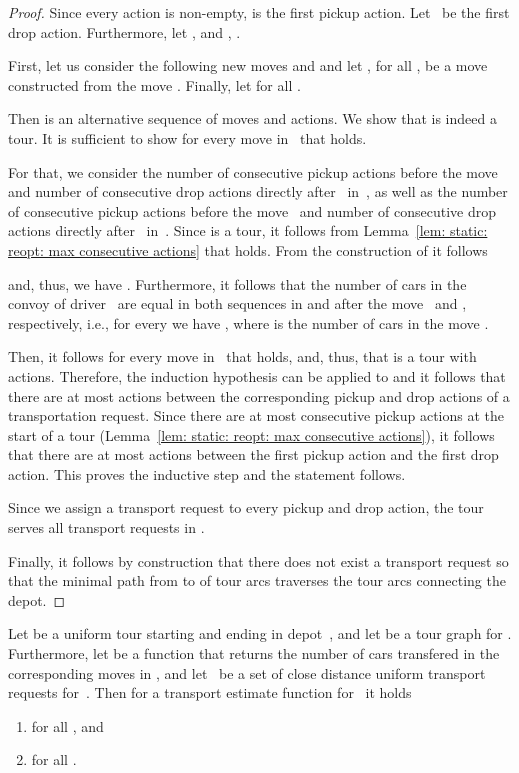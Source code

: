 \documentclass[english]{llncs}
\numberwithin{sublemma}{lemma}
\begin{document}
\begin{proof}
Since every action is non-empty,  is the first pickup action.
Let~ be the first drop action.
Furthermore, let , 
and , .

First, let us consider the following new moves  and 
 and
let , for all , be a move constructed from the move .
Finally, let  for all .

Then 
is an alternative sequence of  moves and  actions.
We show that  is indeed a tour.
It is sufficient to show for every move  in~ that  holds.

For that, we consider the number  of consecutive pickup actions before the move~ and 
number  of consecutive drop actions directly after~ in~,
as well as
the number  of consecutive pickup actions before the move~ and 
number  of consecutive drop actions directly after~ in~.
Since  is a tour, it follows from Lemma~\ref{lem: static: reopt: max consecutive actions} that  holds.
From the construction of  it follows

and, thus, we have .
Furthermore, it follows that the number of cars in the convoy of driver~ are equal in both sequences in and after the move~ and , respectively,
i.e., for every  we have , where  is the number of cars in the move .


Then, it follows for every move  in~ that  holds,
and, thus, that  is a tour with  actions.
Therefore, the induction hypothesis can be applied to  and it follows that there are at most  actions between the corresponding pickup and drop actions of a transportation request.
Since there are at most  consecutive pickup actions at the start of a tour (Lemma~\ref{lem: static: reopt: max consecutive actions}), it follows that there are at most  actions between the first pickup action and the first drop action.
This proves the inductive step and the statement follows.


Since we assign a transport request to every pickup and drop action, the tour serves all transport requests in .


Finally, it follows by construction that there does not exist a transport request  so that the minimal path from  to  of tour arcs traverses the tour arcs connecting the depot.
\end{proof}





\begin{lemma}
\label{cor: static: reopt: existence tour}
  Let  be a uniform tour starting and ending in depot~,
  and let  be a tour graph for .
  Furthermore, let  be a function that returns the number of cars transfered in the corresponding moves in ,
and let~ be a set of close distance uniform transport requests for~.
  Then for a transport estimate function  for~ it holds
  \begin{enumerate}
   \item \label{cor: static: reopt: existence tour: 1}  for all , and
   \item \label{cor: static: reopt: existence tour: 2}  for all .
  \end{enumerate}
\end{lemma}
\end{document}
